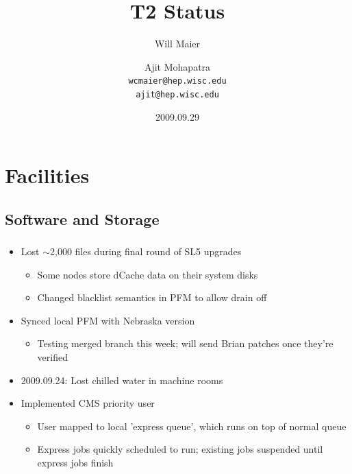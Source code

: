 \documentclass{beamer}
\title{T2 Status}
\author[Maier, Mohapatra]{
    Will Maier \and Ajit Mohapatra\\ 
    {\tt wcmaier@hep.wisc.edu}\\
    {\tt ajit@hep.wisc.edu}}
\institute[Wisconsin]{University of Wisconsin - High Energy Physics}
\date{2009.09.29}
\newcommand{\ca}{\ensuremath{\sim}}
\begin{document}
\begin{frame}
    \titlepage
\end{frame}


\section{Facilities}
\subsection{Software and Storage}
\begin{frame}
\frametitle{}

\begin{itemize}
	\item Lost \ca{}2,000 files during final round of SL5 upgrades
	\begin{itemize}
		\item Some nodes store dCache data on their system disks
		\item Changed blacklist semantics in PFM to allow drain off
	\end{itemize}
	\item Synced local PFM with Nebraska version
	\begin{itemize}
		\item Testing merged branch this week; will send Brian patches once they're verified
	\end{itemize}
	\item 2009.09.24: Lost chilled water in machine rooms
	\item Implemented CMS priority user
	\begin{itemize}
		\item User mapped to local 'express queue', which runs on top of normal queue
		\item Express jobs quickly scheduled to run; existing jobs suspended until express jobs finish
	\end{itemize}

\end{itemize}

\end{frame}
\end{document}
